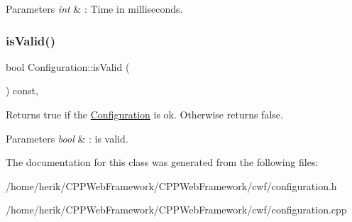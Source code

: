 \begin{DoxyParams}{Parameters}
{\em int} & \+: Time in milliseconds. \\
\hline
\end{DoxyParams}
\mbox{\label{class_configuration_aad998fe40caeeb4c412f00f0874c67c9}} 
\subsubsection{\texorpdfstring{is\+Valid()}{isValid()}}
{\footnotesize\ttfamily bool Configuration\+::is\+Valid (\begin{DoxyParamCaption}{ }\end{DoxyParamCaption}) const\hspace{0.3cm}{\ttfamily [inline]}, {\ttfamily [noexcept]}}



Returns true if the \hyperlink{class_configuration}{Configuration} is ok. Otherwise returns false. 


\begin{DoxyParams}{Parameters}
{\em bool} & \+: is valid. \\
\hline
\end{DoxyParams}


The documentation for this class was generated from the following files\+:\begin{DoxyCompactItemize}
\item 
/home/herik/\+C\+P\+P\+Web\+Framework/\+C\+P\+P\+Web\+Framework/cwf/configuration.\+h\item 
/home/herik/\+C\+P\+P\+Web\+Framework/\+C\+P\+P\+Web\+Framework/cwf/configuration.\+cpp\end{DoxyCompactItemize}
